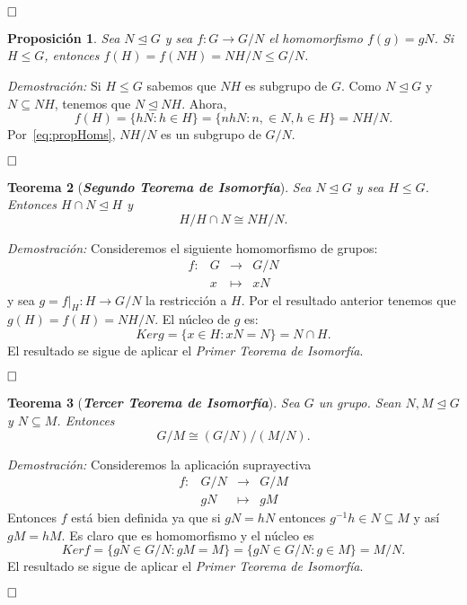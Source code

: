 \documentclass[12pt]{article}
\newtheorem{theorem}{Teorema}[section]
\newtheorem{proposition}[theorem]{Proposición}
\begin{document}
$\hfill \square$

\begin{proposition}Sea $N \unlhd G$ y sea $f \colon G \longrightarrow G/N$ el homomorfismo $f(g) = gN$. Si $H \leq G$, entonces $f(H) = f(NH)=NH/N \leq G/N$.
\end{proposition}
\emph{Demostración: }Si $H \leq G$ sabemos que $NH$ es subgrupo de $G$. Como $N \unlhd G$ y $N \subseteq NH$, tenemos que $N \unlhd NH$. Ahora, $$f(H) = \lbrace hN : h \in H \rbrace = \lbrace nhN :n, \in N, h \in H \rbrace = NH/N.$$ Por~\ref{eq:propHoms}, $NH/N$ es un subgrupo de $G/N$.

$\hfill \square$

\begin{theorem}[\textbf{\textit{Segundo Teorema de Isomorfía}}]
Sea $N \unlhd G$ y sea $H \leq G$. Entonces $H \cap N \unlhd H$ y $$H/H\cap N \cong NH/N.$$

\end{theorem}
\emph{Demostración: }Consideremos el siguiente homomorfismo de grupos: $$\begin{array}{rccl}
f\colon &G&\longrightarrow &G/N \\
&x& \longmapsto &xN
\end{array}
$$
y sea $g = \left.f \right|_H \colon H \longrightarrow G/N$ la restricción a $H$. Por el resultado anterior tenemos que $g(H) = f(H) = NH/N$. El núcleo de $g$ es:
$$Ker g = \lbrace x \in H :xN = N \rbrace = N \cap H.$$ El resultado se sigue de aplicar el \textit{Primer Teorema de Isomorfía}.

$\hfill \square$

\begin{theorem}[\textbf{\textit{Tercer Teorema de Isomorfía}}]
Sea $G$ un grupo. Sean $N,M \unlhd G$ y $N \subseteq M$. Entonces $$G/M \cong (G/N)/(M/N).$$
\end{theorem}
\emph{Demostración: }Consideremos la aplicación suprayectiva $$\begin{array}{rccl}
f \colon &G/N&\longrightarrow &G/M\\
&gN& \longmapsto &gM
\end{array}
$$
Entonces $f$ está bien definida ya que si $gN = hN$ entonces $g^{-1}h \in N \subseteq M$ y así $gM =hM$. Es claro que es homomorfismo y el núcleo es $$Ker f = \lbrace gN \in G/N : gM = M \rbrace = \lbrace gN \in G/N : g \in M \rbrace = M/N.$$
El resultado se sigue de aplicar el \textit{Primer Teorema de Isomorfía}.

$\hfill \square$
\end{document}
